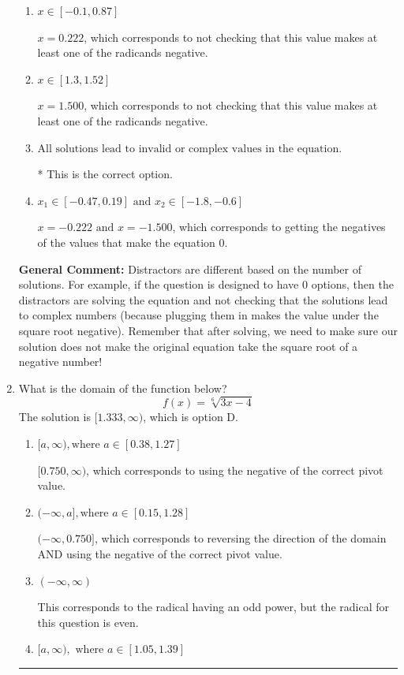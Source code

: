 \documentclass{extbook}[14pt]
\newcommand{\litem}[1]{\item #1

\rule{\textwidth}{0.4pt}}
\begin{document}
\begin{enumerate}
{\begin{enumerate}[label=\Alph*.]
$x = 0.222 \text{ and } x = 1.500$, which corresponds to not checking that BOTH values make at least one of the radicands negative.
\item \( x \in [-0.1,0.87] \)

$x = 0.222$, which corresponds to not checking that this value makes at least one of the radicands negative.
\item \( x \in [1.3,1.52] \)

$x = 1.500$, which corresponds to not checking that this value makes at least one of the radicands negative.
\item \( \text{All solutions lead to invalid or complex values in the equation.} \)

* This is the correct option.
\item \( x_1 \in [-0.47, 0.19] \text{ and } x_2 \in [-1.8,-0.6] \)

$x = -0.222 \text{ and } x = -1.500$, which corresponds to getting the negatives of the values that make the equation 0.
\end{enumerate}

\textbf{General Comment:} Distractors are different based on the number of solutions. For example, if the question is designed to have 0 options, then the distractors are solving the equation and not checking that the solutions lead to complex numbers (because plugging them in makes the value under the square root negative). Remember that after solving, we need to make sure our solution does not make the original equation take the square root of a negative number!
}
\litem{
What is the domain of the function below?
\[ f(x) = \sqrt[6]{3 x - 4} \]The solution is \( [1.333, \infty) \), which is option D.\begin{enumerate}[label=\Alph*.]
\item \( [a, \infty), \text{where } a \in [0.38, 1.27] \)

$[0.750, \infty)$, which corresponds to using the negative of the correct pivot value.
\item \( (-\infty, a], \text{where } a \in [0.15, 1.28] \)

$(-\infty, 0.750]$, which corresponds to reversing the direction of the domain AND using the negative of the correct pivot value.
\item \( (-\infty, \infty) \)

This corresponds to the radical having an odd power, but the radical for this question is even.
\item \( [a, \infty), \text{ where } a \in [1.05, 1.39] \)


\end{enumerate}}
\end{enumerate}
\end{document}
